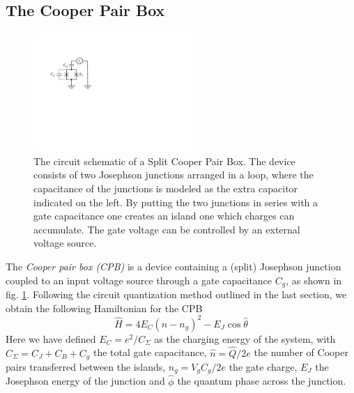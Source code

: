 \subsection{The Cooper Pair Box}

\begin{figure}
	\includegraphics[width=6cm]{"./material/figures/introduction/cooper_pair_box"}
	\caption{The circuit schematic of a Split Cooper Pair Box. The device consists of two Josephson junctions arranged in a loop, where the capacitance of the junctions is modeled as the extra capacitor indicated on the left. By putting the two junctions in series with a gate capacitance one creates an island one which charges can accumulate. The gate voltage can be controlled by an external voltage source.}
	\label{fig:cpb_circuit}
\end{figure}

The {\it Cooper pair box (CPB)} is a device containing a (split) Josephson junction coupled to an input voltage source through a gate capacitance $C_g$, as shown in fig. \ref{fig:cpb_circuit}. Following the circuit quantization method outlined in the last section, we obtain the following Hamiltonian for the CPB \citep{cottet_implementation_2002}
%
\begin{equation}
\hat{H} = 4 E_C \left( \hat{n} - n_g\right)^2-E_J \cos{\hat{\theta}}
\end{equation}
%
Here we have defined $E_C = e^2 / C_\Sigma$ as the charging energy of the system, with $C_\Sigma = C_J+C_B+C_g$ the total gate capacitance, $\hat{n}=\hat{Q}/2e$ the number of Cooper pairs transferred between the islands, $n_g=V_g C_g /2e $ the gate charge, $E_J$ the Josephson energy of the junction and $\hat{\phi}$ the quantum phase across the junction.

\smallskip

